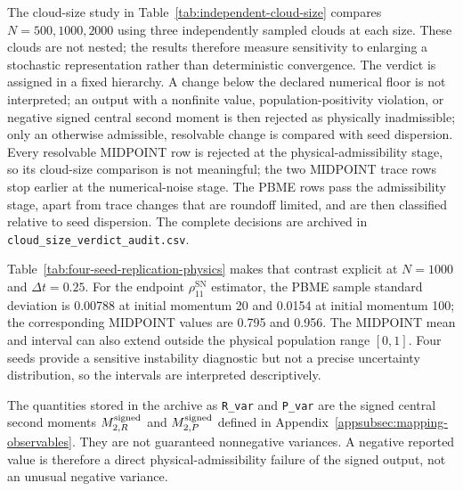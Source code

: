 \documentclass[
  11pt,
  letterpaper,
  onehalfspacing,
  normalmargins,
  equalmargins,
  oneside
]{ut-thesis}
\begin{document}
The cloud-size study in Table~\ref{tab:independent-cloud-size} compares
\(N=500,1000,2000\) using three independently sampled clouds at each size.
These clouds are not nested; the results therefore measure sensitivity to
enlarging a stochastic representation rather than deterministic convergence.
The verdict is assigned in a fixed hierarchy. A change below the declared
numerical floor is not interpreted; an output with a nonfinite value,
population-positivity violation, or negative signed central second moment is
then rejected as physically inadmissible; only an otherwise admissible,
resolvable change is compared with seed dispersion. Every resolvable MIDPOINT
row is rejected at the physical-admissibility stage, so its cloud-size
comparison is not meaningful; the two MIDPOINT trace rows stop earlier at the
numerical-noise stage. The PBME rows pass the admissibility stage, apart from
trace changes that are roundoff limited, and are then classified relative to seed
dispersion. The complete decisions are archived in
\texttt{cloud\_size\_verdict\_audit.csv}.

Table~\ref{tab:four-seed-replication-physics} makes that contrast explicit at
\(N=1000\) and \(\Delta t=0.25\). For the endpoint \(\rho_{11}^{\mathrm{SN}}\) estimator, the
PBME sample standard deviation is 0.00788 at initial momentum 20 and 0.0154 at
initial momentum 100; the corresponding MIDPOINT values are 0.795 and 0.956.
The MIDPOINT mean and interval can also extend outside the physical population
range \([0,1]\). Four seeds provide a sensitive instability diagnostic but
not a precise uncertainty distribution, so the intervals are interpreted
descriptively.

The quantities stored in the archive as \texttt{R\_var} and
\texttt{P\_var} are the signed central second moments
\(M^{\rm signed}_{2,R}\) and \(M^{\rm signed}_{2,P}\) defined in
Appendix~\ref{appsubsec:mapping-observables}. They are not guaranteed
nonnegative variances. A negative reported value is therefore a direct
physical-admissibility failure of the signed output, not an unusual negative
variance.
\end{document}
